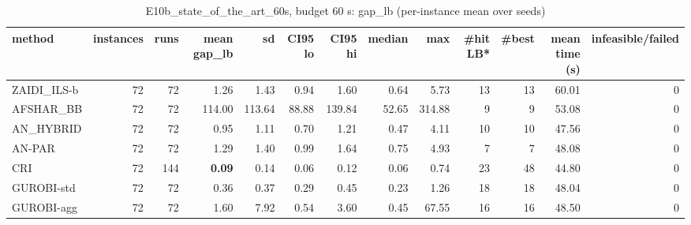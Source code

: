 \begin{table}[htbp]
\centering
\small
\caption{E10b\_state\_of\_the\_art\_60s, budget 60 s: gap\_lb (per-instance mean over seeds)}
\label{tab:E10b_state_of_the_art_60s_b60_summary}
\begin{tabular}{lrrrrrrrrrrrr}
\toprule
method & instances & runs & mean gap\_lb & sd & CI95 lo & CI95 hi & median & max & \#hit LB* & \#best & mean time (s) & infeasible/failed \\
\midrule
ZAIDI\_ILS-b & 72 & 72 & 1.26 & 1.43 & 0.94 & 1.60 & 0.64 & 5.73 & 13 & 13 & 60.01 & 0 \\
AFSHAR\_BB & 72 & 72 & 114.00 & 113.64 & 88.88 & 139.84 & 52.65 & 314.88 & 9 & 9 & 53.08 & 0 \\
AN\_HYBRID & 72 & 72 & 0.95 & 1.11 & 0.70 & 1.21 & 0.47 & 4.11 & 10 & 10 & 47.56 & 0 \\
AN-PAR & 72 & 72 & 1.29 & 1.40 & 0.99 & 1.64 & 0.75 & 4.93 & 7 & 7 & 48.08 & 0 \\
CRI & 72 & 144 & \textbf{0.09} & 0.14 & 0.06 & 0.12 & 0.06 & 0.74 & 23 & 48 & 44.80 & 0 \\
GUROBI-std & 72 & 72 & 0.36 & 0.37 & 0.29 & 0.45 & 0.23 & 1.26 & 18 & 18 & 48.04 & 0 \\
GUROBI-agg & 72 & 72 & 1.60 & 7.92 & 0.54 & 3.60 & 0.45 & 67.55 & 16 & 16 & 48.50 & 0 \\
\bottomrule
\end{tabular}
\end{table}
